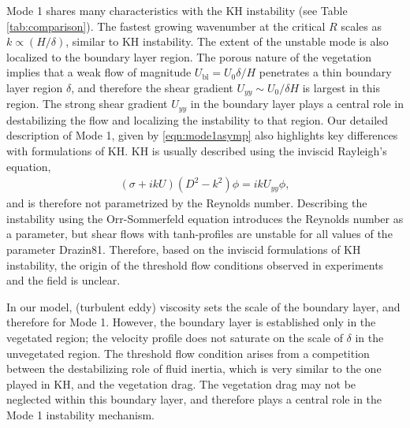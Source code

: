 \documentclass[12pt]{report}   %
\newcommand{\Rey}{{R}}
\newcommand{\Ndg}{\tilde{N}_g}
\newcommand{\ubl}{U_\text{bl}}
\begin{document}
Mode 1 shares many characteristics with the KH instability (see Table \ref{tab:comparison}). 
The fastest growing wavenumber at the critical $\Rey$ scales as $k \propto (H/\delta)$, similar to KH instability. 
The extent of the unstable mode is also localized to the boundary layer region.
The porous nature of the vegetation implies that a weak flow of magnitude $\ubl = U_0 \delta/H$ penetrates a thin boundary layer region $\delta$, and therefore the shear gradient $U_{yy} \sim U_0/\delta H$ is largest in this region. 
The strong shear gradient $U_{yy}$ in the boundary layer plays a central role in destabilizing the flow and localizing the instability to that region. 
Our detailed description of Mode 1, given by \eqref{eqn:mode1asymp} also highlights key differences with formulations of KH. 
KH is usually described using the inviscid Rayleigh's equation, 
\begin{align}
\left(\sigma+ikU\right) \left(D^2-k^2\right)\phi =  ikU_{yy}\phi, 
\label{eqn:Rayleigh}
\end{align}
and is therefore not parametrized by the Reynolds number.
Describing the instability using the Orr-Sommerfeld equation introduces the Reynolds number as a parameter, but shear flows with tanh-profiles are unstable for all values of the parameter {Drazin81}.
Therefore, based on the inviscid formulations of KH instability, the origin of the threshold flow conditions observed in experiments and the field is unclear.

In our model, (turbulent eddy) viscosity sets the scale of the boundary layer, and therefore for Mode 1.
However, the boundary layer is established only in the vegetated region; the velocity profile does not saturate on the scale of $\delta$ in the unvegetated region.
The threshold flow condition arises from a competition between the destabilizing role of fluid inertia, which is very similar to the one played in KH, and the vegetation drag.
The vegetation drag may not be neglected within this boundary layer, and therefore plays a central role in the Mode 1 instability mechanism.

\end{document}
